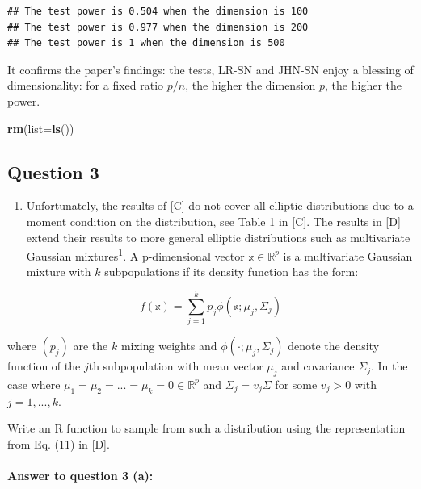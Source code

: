 \documentclass[
]{article}
\newenvironment{Shaded}{\begin{snugshade}}{\end{snugshade}}
\newcommand{\AttributeTok}[1]{\textcolor[rgb]{0.13,0.29,0.53}{#1}}
\newcommand{\FunctionTok}[1]{\textcolor[rgb]{0.13,0.29,0.53}{\textbf{#1}}}
\newcommand{\NormalTok}[1]{#1}
\providecommand{\tightlist}{%
  \setlength{\itemsep}{0pt}\setlength{\parskip}{0pt}}
\begin{document}
\begin{verbatim}
## The test power is 0.504 when the dimension is 100 
## The test power is 0.977 when the dimension is 200 
## The test power is 1 when the dimension is 500
\end{verbatim}

It confirms the paper's findings: the tests, LR-SN and JHN-SN enjoy a
blessing of dimensionality: for a fixed ratio \(p/n\), the higher the
dimension \(p\), the higher the power.

\begin{Shaded}
\begin{Highlighting}[]
\FunctionTok{rm}\NormalTok{(}\AttributeTok{list=}\FunctionTok{ls}\NormalTok{())}
\end{Highlighting}
\end{Shaded}

\subsection{Question 3}\label{question-3}

\begin{enumerate}
\def\labelenumi{(\alph{enumi})}
\tightlist
\item
  Unfortunately, the results of {[}C{]} do not cover all elliptic
  distributions due to a moment condition on the distribution, see Table
  1 in {[}C{]}. The results in {[}D{]} extend their results to more
  general elliptic distributions such as multivariate Gaussian
  mixtures\textsuperscript{1}. A p-dimensional vector
  \(𝕩 \in \mathbb{R}^p\) is a multivariate Gaussian mixture with \(k\)
  subpopulations if its density function has the form:
\end{enumerate}

\[
f(𝕩) = \sum_{j=1}^{k} p_j \phi(𝕩; \mu_j , \Sigma_j)
\]

where \((p_j)\) are the \(k\) mixing weights and
\(\phi(·; \mu_j , \Sigma_j)\) denote the density function of the \(j\)th
subpopulation with mean vector \(\mu_j\) and covariance \(\Sigma_j\). In
the case where \(\mu_1 = \mu_2 = ... = \mu_k = 0 \in \mathbb{R}^p\) and
\(\Sigma_j = v_j\Sigma\) for some \(v_j > 0\) with \(j = 1,...,k\).

Write an R function to sample from such a distribution using the
representation from Eq. (11) in {[}D{]}.

\paragraph{\texorpdfstring{\textbf{Answer to question 3
(a)}:}{Answer to question 3 (a):}}\label{answer-to-question-3-a}
\end{document}

